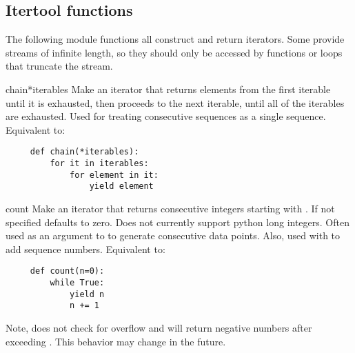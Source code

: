 \begin{seealso}

\end{seealso}


\subsection{Itertool functions \label{itertools-functions}}

The following module functions all construct and return iterators.
Some provide streams of infinite length, so they should only be accessed
by functions or loops that truncate the stream.

\begin{funcdesc}{chain}{*iterables}
  Make an iterator that returns elements from the first iterable until
  it is exhausted, then proceeds to the next iterable, until all of the
  iterables are exhausted.  Used for treating consecutive sequences as
  a single sequence.  Equivalent to:

  \begin{verbatim}
     def chain(*iterables):
         for it in iterables:
             for element in it:
                 yield element
  \end{verbatim}
\end{funcdesc}

\begin{funcdesc}{count}{}
  Make an iterator that returns consecutive integers starting with .
  If not specified  defaults to zero.  
  Does not currently support python long integers.  Often used as an
  argument to  to generate consecutive data points.
  Also, used with  to add sequence numbers.  Equivalent to:

  \begin{verbatim}
     def count(n=0):
         while True:
             yield n
             n += 1
  \end{verbatim}

  Note,  does not check for overflow and will return
  negative numbers after exceeding .  This behavior
  may change in the future.
\end{funcdesc}

